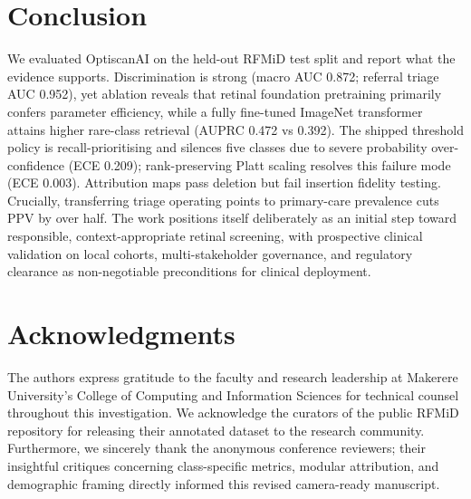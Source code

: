 \documentclass[11pt]{IEEEtran}
\begin{document}
\section{Conclusion}

We evaluated OptiscanAI on the held-out RFMiD test split and report what the evidence supports.
Discrimination is strong (macro AUC 0.872; referral triage AUC 0.952), yet ablation reveals that retinal
foundation pretraining primarily confers parameter efficiency, while a fully fine-tuned ImageNet transformer
attains higher rare-class retrieval (AUPRC 0.472 vs 0.392). The shipped threshold policy is recall-prioritising
and silences five classes due to severe probability over-confidence (ECE 0.209); rank-preserving Platt scaling
resolves this failure mode (ECE 0.003). Attribution maps pass deletion but fail insertion fidelity testing.
Crucially, transferring triage operating points to primary-care prevalence cuts PPV by over half. The work
positions itself deliberately as an initial step toward responsible, context-appropriate retinal screening,
with prospective clinical validation on local cohorts, multi-stakeholder governance, and regulatory clearance
as non-negotiable preconditions for clinical deployment.

\section*{Acknowledgments}
The authors express gratitude to the faculty and research leadership at Makerere University's College
of Computing and Information Sciences for technical counsel throughout this investigation. We acknowledge
the curators of the public RFMiD repository for releasing their annotated dataset to the research community.
Furthermore, we sincerely thank the anonymous conference reviewers; their insightful critiques concerning
class-specific metrics, modular attribution, and demographic framing directly informed this revised
camera-ready manuscript.
\end{document}
